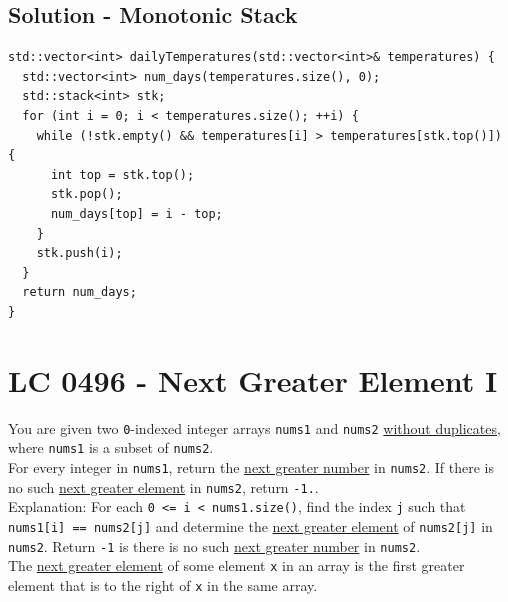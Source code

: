 \subsection*{Solution - Monotonic Stack}
\begin{lstlisting}
std::vector<int> dailyTemperatures(std::vector<int>& temperatures) {
  std::vector<int> num_days(temperatures.size(), 0);
  std::stack<int> stk;
  for (int i = 0; i < temperatures.size(); ++i) {
    while (!stk.empty() && temperatures[i] > temperatures[stk.top()]) {
      int top = stk.top();
      stk.pop();
      num_days[top] = i - top;
    }
    stk.push(i);
  }
  return num_days;
}
\end{lstlisting}

\section{LC 0496 - Next Greater Element I}
You are given two {\colorbox{CodeBackground}{\lstinline|0|}}-indexed integer arrays {\colorbox{CodeBackground}{\lstinline|nums1|}} and {\colorbox{CodeBackground}{\lstinline|nums2|}} \ul{without duplicates}, where {\colorbox{CodeBackground}{\lstinline|nums1|}} is a subset of {\colorbox{CodeBackground}{\lstinline|nums2|}}. \\

 For every integer in {\colorbox{CodeBackground}{\lstinline|nums1|}}, return the \ul{next greater number} in {\colorbox{CodeBackground}{\lstinline|nums2|}}. If there is no such \ul{next greater element} in {\colorbox{CodeBackground}{\lstinline|nums2|}}, return {\colorbox{CodeBackground}{\lstinline|-1.|}}.\\
 
 Explanation: For each {\colorbox{CodeBackground}{\lstinline|0 <= i < nums1.size()|}}, find the index {\colorbox{CodeBackground}{\lstinline|j|}} such that {\colorbox{CodeBackground}{\lstinline|nums1[i] == nums2[j]|}} and determine the \ul{next greater element} of {\colorbox{CodeBackground}{\lstinline|nums2[j]|}} in {\colorbox{CodeBackground}{\lstinline|nums2|}}. Return {\colorbox{CodeBackground}{\lstinline|-1|}} is there is no such \ul{next greater number} in {\colorbox{CodeBackground}{\lstinline|nums2|}}.\\

The \ul{next greater element} of some element {\colorbox{CodeBackground}{\lstinline|x|}} in an array is the first greater element that is to the right of {\colorbox{CodeBackground}{\lstinline|x|}} in the same array.\\

